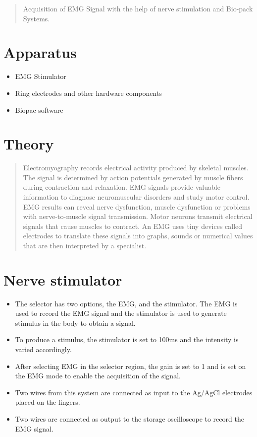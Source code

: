 \documentclass[
  11pt,
  letterpaper,
  DIV=11,
  numbers=noendperiod]{scrreprt}
\providecommand{\tightlist}{%
  \setlength{\itemsep}{0pt}\setlength{\parskip}{0pt}}\usepackage{longtable,booktabs,array}
\begin{document}
\begin{quote}
Acquisition of EMG Signal with the help of nerve stimulation and
Bio-pack Systems.
\end{quote}

\section{Apparatus}\label{apparatus-1}

\begin{itemize}
\item
  EMG Stimulator
\item
  Ring electrodes and other hardware components
\item
  Biopac software
\end{itemize}

\section{Theory}\label{theory-2}

\begin{quote}
Electromyography records electrical activity produced by skeletal
muscles. The signal is determined by action potentials generated by
muscle fibers during contraction and relaxation. EMG signals provide
valuable information to diagnose neuromuscular disorders and study motor
control. EMG results can reveal nerve dysfunction, muscle dysfunction or
problems with nerve-to-muscle signal transmission. Motor neurons
transmit electrical signals that cause muscles to contract. An EMG uses
tiny devices called electrodes to translate these signals into graphs,
sounds or numerical values that are then interpreted by a specialist.
\end{quote}

\section{Nerve stimulator}\label{nerve-stimulator}

\begin{itemize}
\tightlist
\item
  The selector has two options, the EMG, and the stimulator. The EMG is
  used to record the EMG signal and the stimulator is used to generate
  stimulus in the body to obtain a signal.
\item
  To produce a stimulus, the stimulator is set to 100ms and the
  intensity is varied accordingly.
\item
  After selecting EMG in the selector region, the gain is set to 1 and
  is set on the EMG mode to enable the acquisition of the signal.
\item
  Two wires from this system are connected as input to the Ag/AgCl
  electrodes placed on the fingers.
\item
  Two wires are connected as output to the storage oscilloscope to
  record the EMG signal.
\end{itemize}
\end{document}
